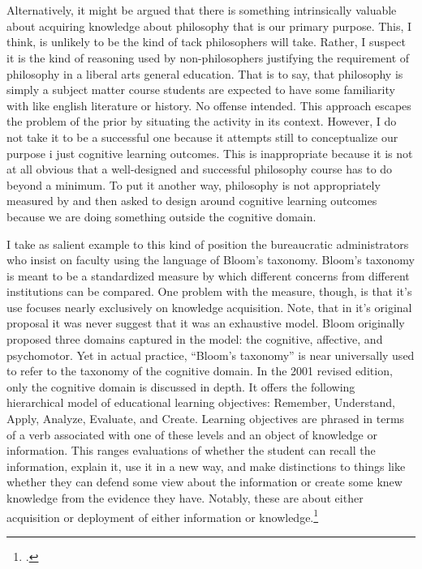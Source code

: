 \documentclass[letterpaper,notitlepage,12pt]{article}
\begin{document}
\section{}


Alternatively, it might be argued that there is something intrinsically valuable
about acquiring knowledge about philosophy that is our primary purpose.
This, I think, is unlikely to be the kind of tack philosophers will take.
Rather, I suspect it is the kind of reasoning used by non-philosophers
justifying the requirement of philosophy in a liberal arts general education.
That is to say, that philosophy is simply a subject matter course students are
expected to have some familiarity with like english literature or history.
No offense intended.
This approach escapes the problem of the prior by situating the activity in its
context.
However, I do not take it to be a successful one because it attempts still to
conceptualize our purpose i just cognitive learning outcomes.
This is inappropriate because it is not at all obvious that a well-designed and
successful philosophy course has to do beyond a minimum.
To put it another way, philosophy is not appropriately measured by and then
asked to design around cognitive learning outcomes because we are doing
something outside the cognitive domain.

I take as salient example to this kind of position the
bureaucratic administrators who insist on faculty using the language of Bloom's
taxonomy.
Bloom's taxonomy is meant to be a standardized measure by which different
concerns from different institutions can be compared.
One problem with the measure, though, is that it's use focuses nearly
exclusively on knowledge acquisition.
Note, that in it's original proposal it was never suggest that it was an
exhaustive model.
Bloom originally proposed three domains captured in the model: the
cognitive, affective, and psychomotor.
Yet in actual practice, ``Bloom's taxonomy'' is near universally used to refer
to the taxonomy of the cognitive domain.
In the 2001 revised edition, only the cognitive domain is discussed in depth.
It offers the following hierarchical model of educational learning objectives:
Remember, Understand, Apply, Analyze, Evaluate, and Create.
Learning objectives are phrased in terms of a verb associated with one of these
levels and an object of knowledge or information.
This ranges evaluations of whether the student can recall the information,
explain it, use it in a new way, and make distinctions to things like whether
they can defend some view about the information or create some knew knowledge
from the evidence they have.
Notably, these are about either acquisition or deployment of either information
or knowledge.\footcite{armstrong_blooms_nodate}
\end{document}
